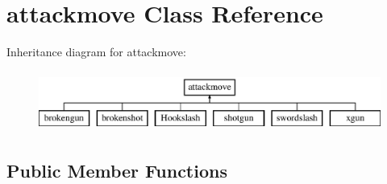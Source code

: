 \hypertarget{classattackmove}{\section{attackmove Class Reference}
\label{classattackmove}
}
Inheritance diagram for attackmove\-:\begin{figure}[H]
\begin{center}
\leavevmode
\includegraphics[height=2.000000cm]{classattackmove}
\end{center}
\end{figure}
\subsection*{Public Member Functions}
